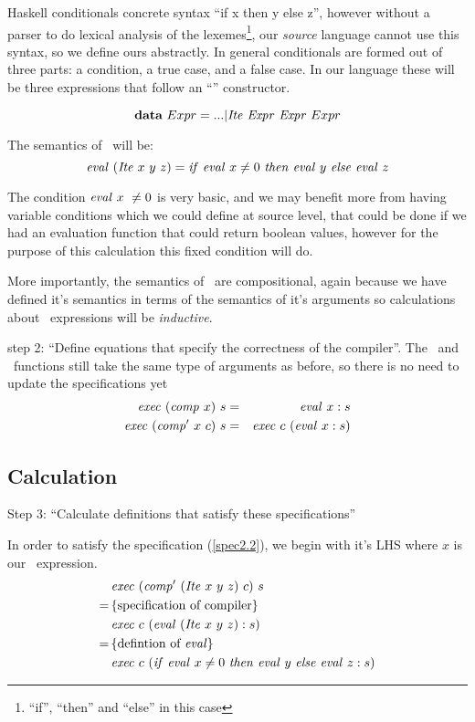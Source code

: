 \documentclass {article}
\begin{document}
Haskell conditionals concrete
syntax ``if  x then y else z'',
however without a parser to do
lexical analysis\cite[chapter 2.2]{dragon} of the lexemes\footnote{
``if'', ``then'' and ``else'' in this case},
our \emph{source} language cannot use this
syntax, so we define ours abstractly.
In general conditionals are formed out of three parts:
a condition, a true case, and a false case.
In our language these will be three expressions
that follow an ``\ite'' constructor.

\[ \textbf{data}\ Expr = ... | \mathit{Ite\ } \mathit{Expr\ } \mathit{Expr\ } Expr \]

\noindent The semantics of \ite\ will be:
\newcommand{\ifff}{\mathit{if\ }}
\newcommand{\tthen}{\mathit{then\ }}
\newcommand{\eelse }{\mathit{else\ }}
\begin{equation}
\evalf (\Ite x\ y\ z) \\
	= \ifff \evalf x \not= 0\ 
		\tthen \evalf y\ \eelse  \evalf z 
			\label{evalite}
\end{equation}

The condition $\mathit{eval\ } x\ \not= 0$ is very basic,
and we may benefit more from having variable conditions
which we could define at source level,
that could be done if we had an evaluation function 
that could return boolean values, 
however for the purpose of this calculation
this fixed condition will do.

More importantly, the semantics of \ite\
are compositional, 
again because we have defined it's
semantics in terms of the semantics of 
it's arguments so
calculations about \ite\ expressions
will be \emph{inductive}.

step 2: ``Define equations that specify the correctness of the compiler''.
The \exec\ and \comp\ functions still take the same
type of arguments as before,
so there is no need to update the specifications yet
\begin{eqnarray}
\mathit{exec\ }  (\mathit{comp\ }  x)\  s &=& \mathit{eval\ }   x:s \label{spec1.2}\\
\mathit{exec\ }  (\mathit{comp'\ }   x\  c)\ s &=& \mathit{exec\ }  c\  (\mathit{eval\ }  x:s) \label{spec2.2}
\end{eqnarray}

\subsection{Calculation}

Step 3: ``Calculate definitions that 
		satisfy these specifications''

In order to satisfy the specification (\ref{spec2.2}),
we begin with it's LHS where $x$ is our
\ite\ expression.
\begin{align*}
	&\Exec (\Compp  (\Ite x\ y\ z)\ c)\ s \\
	=\, & \{ \mbox{specification of compiler} \} \\
	&\Exec c\ (\evalf  (\Ite x\ y\ z) : s) \\
	=\, & \{\mbox{defintion of \eval}\} \\
	&\Exec c\ (\ifff \evalf x \not= 0\ 
		\tthen \evalf y\ \eelse  \evalf z : s)
\end{align*}
\end{document}

